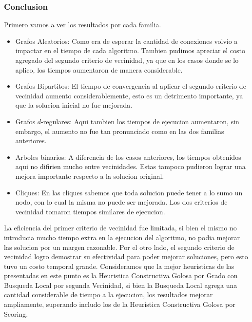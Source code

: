 \subsubsection{Conclusion}

Primero vamos a ver los resultados por cada familia.

\begin{itemize}
	\item Grafos Aleatorios: Como era de esperar la cantidad de conexiones volvio a impactar en el tiempo de cada algoritmo. Tambien pudimos apreciar el costo agregado del segundo criterio de vecinidad, ya que en los casos donde se lo aplico, los tiempos aumentaron de manera considerable.
	\item Grafos Bipartitos: El tiempo de convergencia al aplicar el segundo criterio de vecinidad aumento considerablemente, esto es un detrimento importante, ya que la solucion inicial no fue mejorada.
	\item Grafos $d$-regulares: Aqui tambien los tiempos de ejecucion aumentaron, sin embargo, el aumento no fue tan pronunciado como en las dos familias anteriores.
	\item Arboles binarios: A diferencia de los casos anteriores, los tiempos obtenidos aqui no difirien mucho entre vecinidades. Estas tampoco pudieron lograr una mejora importante respecto a la solucion original.
	\item Cliques: En las cliques sabemos que toda solucion puede tener a lo sumo un nodo, con lo cual la misma no puede ser mejorada. Los dos criterios de vecinidad tomaron tiempos similares de ejecucion.
\end{itemize}

La eficiencia del primer criterio de vecinidad fue limitada, si bien el mismo no introducia mucho tiempo extra en la ejecucion del algoritmo, no podia mejorar las solucion por un margen razonable. Por el otro lado, el segundo criterio de vecinidad logro demostrar su efectividad para poder mejorar soluciones, pero esto tuvo un costo temporal grande. Consideramos que la mejor heuristicas de las presentadas en este punto es la Heuristica Constructiva Golosa por Grado con Busqueda Local por segunda Vecinidad, si bien la Busqueda Local agrega una cantidad considerable de tiempo a la ejecucion, los resultados mejorar ampliamente, superando includo los de la Heuristica Constructiva Golosa por Scoring.